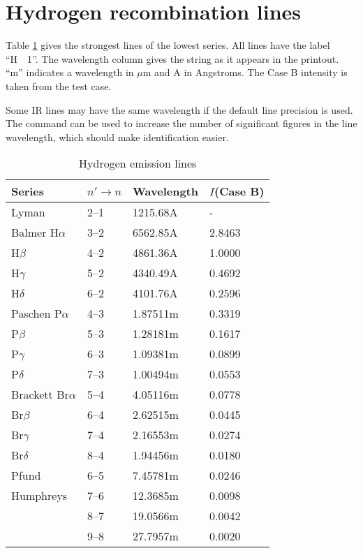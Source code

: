 \section{Hydrogen recombination lines}

Table \ref{tab:HydrogenEmissionLines} gives the strongest lines
of the lowest series.
All lines have the label ``H~~1''.
The wavelength column gives
the string as it appears in the printout.  ``m'' indicates a wavelength
in $\mu$m and A in Angstroms.
The Case B intensity is taken from the
 test case.

Some IR lines may have the same wavelength if the default line precision is used.
The  command can be used 
to increase the number of significant figures in the
line wavelength, which should make identification easier.

\begin{table}
\centering
\caption{\label{tab:HydrogenEmissionLines}Hydrogen emission lines}
\begin{tabular}{llll}
\hline
Series& $n'\to n$& Wavelength& $I$(Case B)\\
\hline
Lyman& 2--1& 1215.68A& - \\
Balmer H$\alpha$& 3--2& 6562.85A     &2.8463\\
H$\beta$& 4--2& 4861.36A     &1.0000\\
H$\gamma$& 5--2& 4340.49A     &0.4692\\
H$\delta$& 6--2& 4101.76A     &0.2596\\
Paschen P$\alpha$& 4--3& 1.87511m   & 0.3319\\
P$\beta$& 5--3& 1.28181m    &0.1617\\
P$\gamma$& 6--3& 1.09381m    &0.0899\\
P$\delta$& 7--3& 1.00494m    &0.0553\\
Brackett Br$\alpha$& 5--4& 4.05116m &    0.0778\\
Br$\beta$& 6--4& 2.62515m&     0.0445\\
Br$\gamma$& 7--4& 2.16553m&     0.0274\\
Br$\delta$& 8--4& 1.94456m&     0.0180\\
Pfund& 6--5& 7.45781m& 0.0246\\
Humphreys& 7--6& 12.3685m& 0.0098\\
& 8--7& 19.0566m& 0.0042\\
& 9--8& 27.7957m& 0.0020\\
\hline
\end{tabular}
\end{table}


